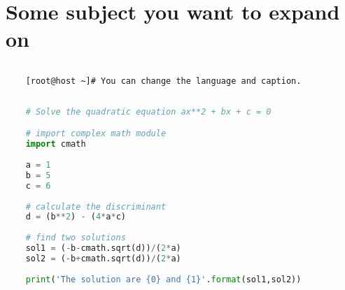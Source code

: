 \chapter{Some subject you want to expand on}
\label{chap:Some subject you want to expand on} 


    
    \lstset{style=mystyle} %
    
    \begin{lstlisting}[language=bash, caption= Bash example]
    
    [root@host ~]# You can change the language and caption.

    \end{lstlisting}



    \begin{lstlisting}[language=python, caption= Python example]
    
    # Solve the quadratic equation ax**2 + bx + c = 0

    # import complex math module
    import cmath
    
    a = 1
    b = 5
    c = 6
    
    # calculate the discriminant
    d = (b**2) - (4*a*c)
    
    # find two solutions
    sol1 = (-b-cmath.sqrt(d))/(2*a)
    sol2 = (-b+cmath.sqrt(d))/(2*a)
    
    print('The solution are {0} and {1}'.format(sol1,sol2))

    \end{lstlisting}


